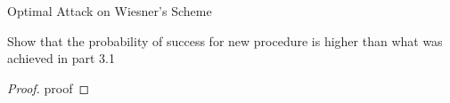 \begin{solution}{Optimal Attack on Wiesner’s Scheme}\label{ques:x}
    \begin{question}
    Show that the probability of success for new procedure is higher than what was achieved
in part 3.1
    \end{question}
    \tcblower{}
    \begin{proof}
    proof
    \end{proof}
\end{solution}
 